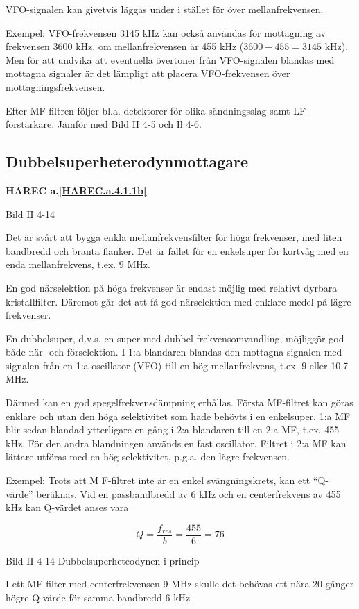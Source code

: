 VFO-signalen kan givetvis läggas under i stället för över
mellanfrekvensen.

Exempel: VFO-frekvensen 3145 kHz kan också användas för mottagning av
frekvensen 3600 kHz, om mellanfrekvensen är 455 kHz (\(3600 - 455 =
3145\) kHz). Men för att undvika att eventuella övertoner från
VFO-signalen blandas med mottagna signaler är det lämpligt att placera
VFO-frekvensen över mottagningsfrekvensen.

Efter MF-filtren följer bl.a. detektorer för olika sändningsslag samt
LF-förstärkare.  Jämför med Bild II 4-5 och Il 4-6.

\subsection{Dubbelsuperheterodynmottagare}
\textbf{HAREC a.\ref{HAREC.a.4.1.1b}\label{myHAREC.a.4.1.1b}}

Bild II 4-14

Det är svårt att bygga enkla mellanfrekvensfilter för höga frekvenser,
med liten bandbredd och branta flanker. Det är fallet för en
enkelsuper för kortvåg med en enda mellanfrekvens, t.ex. 9 MHz.

En god närselektion på höga frekvenser är endast möjlig med relativt
dyrbara kristallfilter. Däremot går det att få god närselektion med
enklare medel på lägre frekvenser.

En dubbelsuper, d.v.s. en super med dubbel frekvensomvandling,
möjliggör god både när- och förselektion. I 1:a blandaren blandas den
mottagna signalen med signalen från en 1:a oscillator (VFO) till en
hög mellanfrekvens, t.ex. 9 eller 10.7 MHz.

Därmed kan en god spegelfrekvensdämpning erhållas. Första MF-filtret
kan göras enklare och utan den höga selektivitet som hade behövts i en
enkelsuper. 1:a MF blir sedan blandad ytterligare en gång i 2:a
blandaren till en 2:a MF, t.ex. 455 kHz. För den andra blandningen
används en fast oscillator. Filtret i 2:a MF kan lättare utföras med
en hög selektivitet, p.g.a. den lägre frekvensen.

Exempel: Trots att M F-filtret inte är en enkel svängningskrets, kan
ett ``Q-värde'' beräknas. Vid en passbandbredd av 6 kHz och en
centerfrekvens av 455 kHz kan Q-värdet anses vara

\[ Q = \frac{f_{res}}{b} = \frac{455}{6} = 76 \]

Bild II 4-14 Dubbelsuperheteodynen i princip

I ett MF-filter med centerfrekvensen 9
MHz skulle det behövas ett nära 20 gånger
högre Q-värde för samma bandbredd 6 kHz

